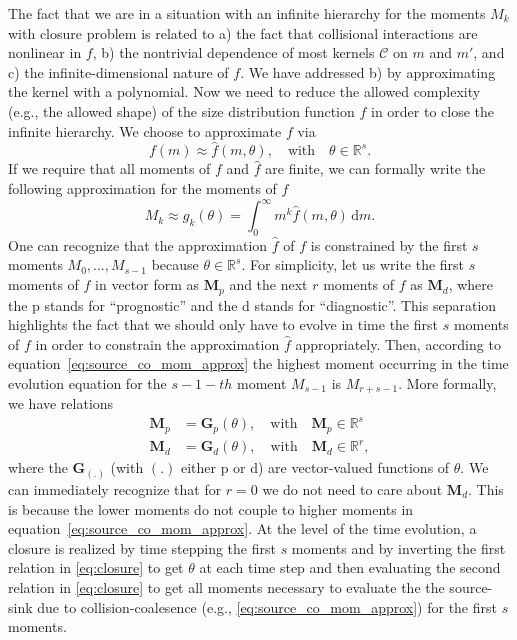 \documentclass{report}
\begin{document}
The fact that we are in a situation with an infinite hierarchy for the moments $M_k$ with closure problem is related to a) the fact that collisional interactions are nonlinear in $f$, b) the nontrivial dependence of most kernels $\mathcal{C}$ on $m$ and $m'$, and c) the infinite-dimensional nature of $f$. We have addressed b) by approximating the kernel with a polynomial. Now we need to reduce the allowed complexity (e.g., the allowed shape) of the size distribution function $f$ in order to close the infinite hierarchy. We choose to approximate $f$ via
\begin{equation}
    f(m) \approx \hat{f}(m, \theta), \quad \text{with} \quad \theta \in \mathbb{R}^{s}.
\end{equation}
If we require that all moments of $f$ and $\hat{f}$ are finite, we can formally write the following approximation for the moments of $f$
\begin{equation}
    M_k \approx g_k(\theta) = \int_0^\infty m^k\hat{f}(m, \theta) \, \text{d}m.
\end{equation}
One can recognize that the approximation $\hat{f}$ of $f$ is constrained by the first $s$ moments $M_0, \dots, M_{s-1}$ because $\theta \in \mathbb{R}^s$. For simplicity, let us write the first $s$ moments of $f$ in vector form as $\mathbf{M}_p$ and the next $r$ moments of $f$ as $\mathbf{M}_d$, where the p stands for ``prognostic'' and the d stands for ``diagnostic''. This separation highlights the fact that we should only have to evolve in time the first $s$ moments of $f$ in order to constrain the approximation $\hat{f}$ appropriately. Then, according to equation~\eqref{eq:source_co_mom_approx} the highest moment occurring in the time evolution equation for the $s-1-th$ moment $M_{s-1}$ is $M_{r+s-1}$. More formally, we have relations
\begin{subequations}\label{eq:closure}
\begin{align}
    \mathbf{M}_p &= \mathbf{G}_p(\theta), \quad \text{with} \quad \mathbf{M}_p \in \mathbb{R}^s \\
    \mathbf{M}_d &= \mathbf{G}_d(\theta), \quad \text{with} \quad \mathbf{M}_d \in \mathbb{R}^r,
\end{align}
\end{subequations}
where the $\mathbf{G}_{(.)}$ (with $(.)$ either p or d) are vector-valued functions of $\theta$. We can immediately recognize that for $r = 0$ we do not need to care about $\mathbf{M}_d$. This is because the lower moments do not couple to higher moments in equation~\eqref{eq:source_co_mom_approx}. At the level of the time evolution, a closure is realized by time stepping the first $s$ moments and by inverting the first relation in \eqref{eq:closure} to get $\theta$ at each time step and then evaluating the second relation in \eqref{eq:closure} to get all moments necessary to evaluate the the source-sink due to collision-coalesence (e.g., \eqref{eq:source_co_mom_approx}) for the first $s$ moments.
\end{document}
